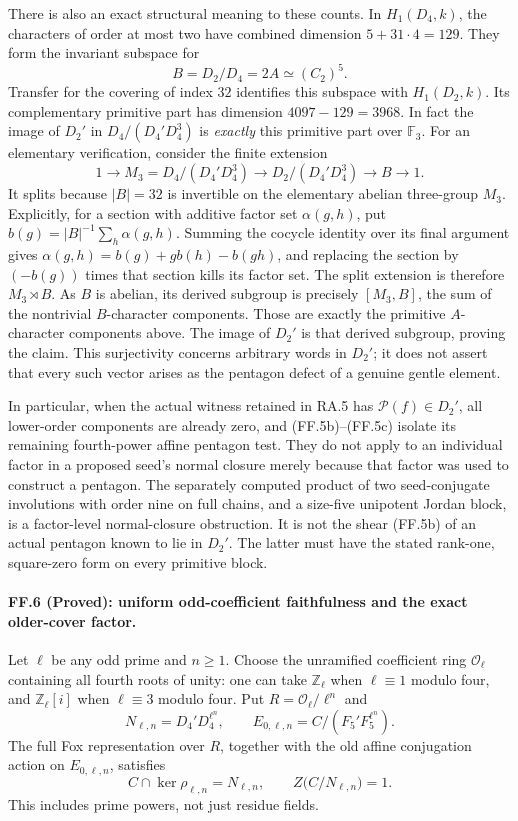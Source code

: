 There is also an exact structural meaning to these counts.
In $H_1(D_4,k)$, the characters of order at most two have
combined dimension $5+31\cdot4=129$. They form the
invariant subspace for
\[
                    B=D_2/D_4=2A\simeq(C_2)^5.
\]
Transfer for the covering of index $32$ identifies this
subspace with $H_1(D_2,k)$. Its complementary primitive
part has dimension $4097-129=3968$.
In fact the image of $D_2'$ in $D_4/(D_4'D_4^3)$ is
\emph{exactly} this primitive part over $\mathbb F_3$.
For an elementary verification, consider the finite extension
\[
 1\longrightarrow M_3=D_4/(D_4'D_4^3)
 \longrightarrow D_2/(D_4'D_4^3)
 \longrightarrow B\longrightarrow1.
\]
It splits because $|B|=32$ is invertible on the elementary
abelian three-group $M_3$. Explicitly, for a section with
additive factor set $\alpha(g,h)$, put
$b(g)=|B|^{-1}\sum_h\alpha(g,h)$. Summing the cocycle
identity over its final argument gives
$\alpha(g,h)=b(g)+g b(h)-b(gh)$, and replacing the section
by $(-b(g))$ times that section kills its factor set.
The split extension is therefore $M_3\rtimes B$. As $B$
is abelian, its derived subgroup is precisely $[M_3,B]$,
the sum of the nontrivial $B$-character components. Those
are exactly the primitive $A$-character components above.
The image of $D_2'$ is that derived subgroup, proving the
claim. This surjectivity concerns arbitrary words in
$D_2'$; it does not assert that every such vector arises
as the pentagon defect of a genuine gentle element.

In particular, when the actual witness retained in RA.5
has $\mathcal P(f)\in D_2'$, all lower-order components
are already zero, and (FF.5b)--(FF.5c) isolate its remaining
fourth-power affine pentagon test. They do not apply to an
individual factor in a proposed seed's normal closure merely
because that factor was used to construct a pentagon.
The separately computed product of two seed-conjugate
involutions with order nine on full chains, and a size-five
unipotent Jordan block, is a factor-level normal-closure
obstruction. It is not the shear (FF.5b) of an actual
pentagon known to lie in $D_2'$. The latter must have the
stated rank-one, square-zero form on every primitive block.

\paragraph{FF.6 (Proved): uniform odd-coefficient faithfulness and the exact older-cover factor.}
Let $\ell$ be any odd prime and $n\geq1$. Choose the unramified
coefficient ring $\mathcal O_\ell$ containing all fourth roots
of unity: one can take $\mathbb Z_\ell$ when $\ell\equiv1$
modulo four, and $\mathbb Z_\ell[i]$ when $\ell\equiv3$
modulo four. Put $R=\mathcal O_\ell/\ell^n$ and
\[
 N_{\ell,n}=D_4'D_4^{\ell^n},\qquad
 E_{0,\ell,n}=C/(F_5'F_5^{\ell^n}).
\]
The full Fox representation over $R$, together with the old
affine conjugation action on $E_{0,\ell,n}$, satisfies
\[
 C\cap\ker\rho_{\ell,n}=N_{\ell,n},\qquad
 Z\bigl(C/N_{\ell,n}\bigr)=1.
 \tag{FF.6a}
\]
This includes prime powers, not just residue fields.

